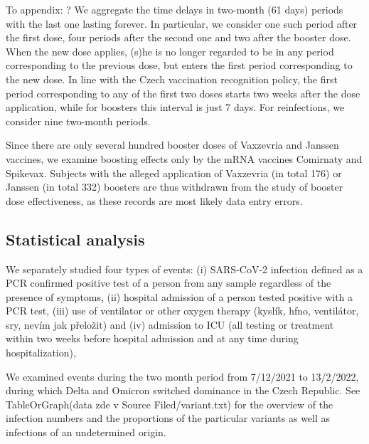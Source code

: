 \documentclass[preprint,12pt,authoryear]{elsarticle}
\begin{document}
{\color{blue} To appendix: ?
We aggregate the time delays in two-month (61 days) periods with the last one lasting forever. In particular, we consider one such period after the first dose, four periods after the second one and two after the booster dose. When the new dose applies, (s)he is no longer regarded to be in any period corresponding to the previous dose, but enters the first period corresponding to the new dose. In line with the Czech vaccination recognition policy, the first period corresponding to any of the first two doses starts two weeks after the dose application, while for boosters this interval is just 7 days. For  reinfections, we consider nine two-month periods.

Since there are only several hundred booster doses of Vaxzevria and Janssen vaccines, we examine boosting effects only by the mRNA vaccines Comirnaty and Spikevax. Subjects with the alleged application of Vaxzevria (in total 176) or Janssen (in total 332) boosters are thus withdrawn from the study of booster dose effectiveness, as these records are most likely data entry errors. }

\subsection{Statistical analysis}

We separately studied four types of events: (i) SARS-CoV-2 infection defined as a PCR confirmed positive test of a person from any sample regardless of the presence of symptoms, (ii) hospital admission of a person tested positive with a PCR test, (iii) use of ventilator or other  oxygen therapy (kyslík, hfno, ventilátor, sry, nevím jak přeložit) and (iv) admission to ICU (all testing or treatment within two weeks before hospital admission and at any time during hospitalization),

We examined events during the two month period from 7/12/2021 to 13/2/2022, during which Delta and Omicron switched dominance in the Czech Republic. See TableOrGraph(data zde v Source Filed/variant.txt) for the overview of the infection numbers and the proportions of the particular variants as well as  infections of an undetermined origin. 
\end{document}
